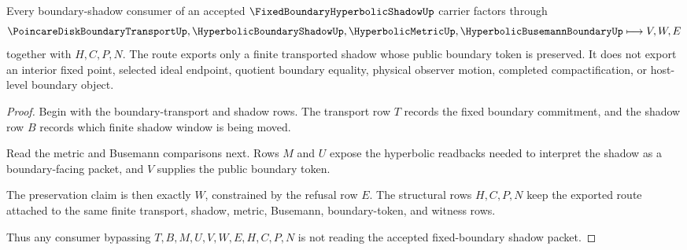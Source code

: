 \begin{theorem}
\label{thm:fixed-boundary-hyperbolic-shadow-boundary-route}
Every boundary-shadow consumer of an accepted $\FixedBoundaryHyperbolicShadowUp$ carrier factors through
$$
\PoincareDiskBoundaryTransportUp,\HyperbolicBoundaryShadowUp,\HyperbolicMetricUp,\HyperbolicBusemannBoundaryUp
\longmapsto
V,W,E
$$
together with $H,C,P,N$. The route exports only a finite transported shadow whose public boundary token is preserved. It does not export an interior fixed point, selected ideal endpoint, quotient boundary equality, physical observer motion, completed compactification, or host-level boundary object.
\end{theorem}
\begin{proof}
Begin with the boundary-transport and shadow rows. The transport row $T$ records the fixed boundary commitment, and the shadow row $B$ records which finite shadow window is being moved.

Read the metric and Busemann comparisons next. Rows $M$ and $U$ expose the hyperbolic readbacks needed to interpret the shadow as a boundary-facing packet, and $V$ supplies the public boundary token.

The preservation claim is then exactly $W$, constrained by the refusal row $E$. The structural rows $H,C,P,N$ keep the exported route attached to the same finite transport, shadow, metric, Busemann, boundary-token, and witness rows.

Thus any consumer bypassing $T,B,M,U,V,W,E,H,C,P,N$ is not reading the accepted fixed-boundary shadow packet.
\end{proof}



